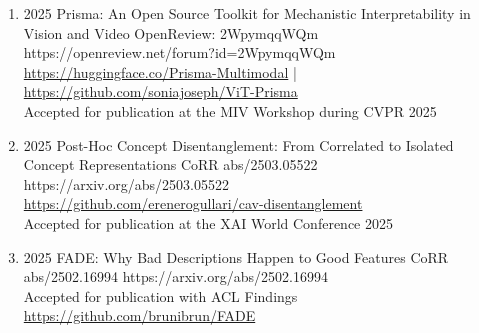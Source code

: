 {\begin{enumerate}
                        
        \item {}
                        {2025}
                        {Prisma: An Open Source Toolkit for Mechanistic Interpretability in Vision and Video}
                        {OpenReview: 2WpymqqWQm}
                        {https://openreview.net/forum?id=2WpymqqWQm}
                        {
                            \\\href{https://huggingface.co/Prisma-Multimodal}{https://huggingface.co/Prisma-Multimodal} | \href{https://github.com/soniajoseph/ViT-Prisma}{https://github.com/soniajoseph/ViT-Prisma}
                            \\ Accepted for publication at the MIV Workshop during CVPR 2025
                        }

                        
        


        \item {}
                        {2025}
                        {Post-Hoc Concept Disentanglement: From Correlated to Isolated Concept Representations}
                        {CoRR abs/2503.05522}
                        {https://arxiv.org/abs/2503.05522}
                        {
                            \\\href{https://github.com/erenerogullari/cav-disentanglement}{https://github.com/erenerogullari/cav-disentanglement}
                            \\ Accepted for publication at the XAI World Conference 2025
                        }
        
        
        \item {}
                        {2025}
                        {FADE: Why Bad Descriptions Happen to Good Features}
                        {CoRR abs/2502.16994}
                        {https://arxiv.org/abs/2502.16994}
                        {
                            \\Accepted for publication with ACL Findings
                            \\\href{https://github.com/brunibrun/FADE}{https://github.com/brunibrun/FADE}
                        }
                        

\end{enumerate}}

